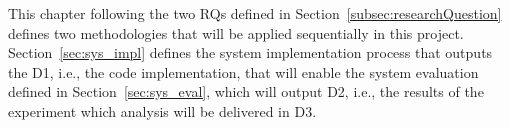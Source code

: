 This chapter following the two \glspl{RQ} defined in Section~\ref{subsec:researchQuestion} defines two methodologies that will be applied sequentially in this project. Section~\ref{sec:sys_impl} defines the system implementation process that outputs the D1, i.e., the code implementation, that will enable the system evaluation defined in Section~\ref{sec:sys_eval}, which will output D2, i.e., the results of the experiment which analysis will be delivered in D3.